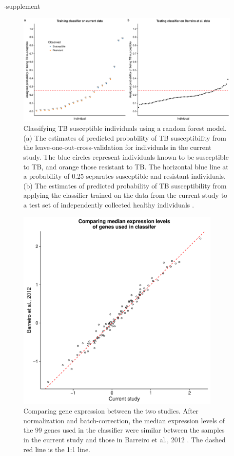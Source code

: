 \documentclass[fleqn,10pt]{wlscirep}
\begin{document}
\begin{filecontents}{\jobname-supplement}
\begin{figure}[ht]
\centering
\includegraphics[width=\linewidth]{../figure/classifier-rf.pdf}
\caption{
Classifying TB susceptible individuals using a random forest model.
(a) The estimates of predicted probability of TB susceptibility from
the leave-one-out-cross-validation for individuals in the current
study. The blue circles represent individuals known to be susceptible
to TB, and orange those resistant to TB. The horizontal blue line at a
probability of 0.25 separates susceptible and resistant individuals.
(b) The estimates of predicted probability of TB susceptibility from
applying the classifier trained on the data from the current study to
a test set of independently collected healthy individuals
\cite{Barreiro2012}.
}
\label{fig:class-rf}
\end{figure}

\begin{figure}[ht]
\centering
\includegraphics[width=4in]{../figure/classifier-exp.pdf}
\caption{
Comparing gene expression between the two studies. After normalization
and batch-correction, the median expression levels of the 99 genes
used in the classifier were similar between the samples in the current
study and those in Barreiro et al., 2012 \cite{Barreiro2012}. The
dashed red line is the 1:1 line.
}
\label{fig:class-exp}
\end{figure}


\end{filecontents}
\end{document}

